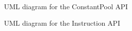 
\begin{figure}[htbp]
  \begin{center}
    \leavevmode
    \textheight
    \caption{UML diagram for the ConstantPool API}\label{fig:umlcp}
  \end{center}
\end{figure}

\begin{figure}[ht]
  \begin{center}
    \leavevmode
    \textheight
    \caption{UML diagram for the Instruction API}\label{fig:umlinstr}
  \end{center}
\end{figure}

